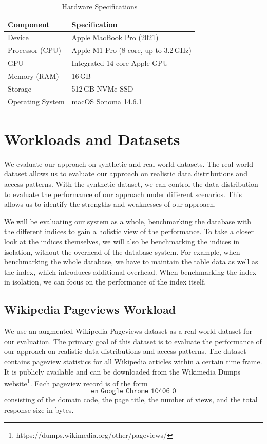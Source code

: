 \begin{table}[htbp]
\centering
\caption{Hardware Specifications}
\label{tab:hardware-specs}
\begin{tabular}{ll}
\toprule
\textbf{Component} & \textbf{Specification} \\ 
\midrule
Device & Apple MacBook Pro (2021) \\
Processor (CPU) & Apple M1 Pro (8-core, up to 3.2\,GHz) \\
GPU & Integrated 14-core Apple GPU \\
Memory (RAM) & 16\,GB \\
Storage & 512\,GB NVMe SSD \\
Operating System & macOS Sonoma 14.6.1 \\
\bottomrule
\end{tabular}
\end{table}

\section{Workloads and Datasets}
\label{sec:workloads-datasets}
We evaluate our approach on synthetic and real-world datasets.
The real-world dataset allows us to evaluate our approach on realistic data distributions and access patterns.
With the synthetic dataset, we can control the data distribution to evaluate the performance of our approach under different scenarios.
This allows us to identify the strengths and weaknesses of our approach.

We will be evaluating our system as a whole, benchmarking the database with the different indices to gain a holistic view of the performance.
To take a closer look at the indices themselves, we will also be benchmarking the indices in isolation, without the overhead of the database system.
For example, when benchmarking the whole database, we have to maintain the table data as well as the index, which introduces additional overhead.
When benchmarking the index in isolation, we can focus on the performance of the index itself.

\subsection*{Wikipedia Pageviews Workload}
We use an augmented Wikipedia Pageviews dataset \cite{wiki_pageviews} as a real-world dataset for our evaluation.
The primary goal of this dataset is to evaluate the performance of our approach on realistic data distributions and access patterns.
The dataset contains pageview statistics for all Wikipedia articles within a certain time frame.
It is publicly available and can be downloaded from the Wikimedia Dumps website\footnote{https://dumps.wikimedia.org/other/pageviews/}.
Each pageview record is of the form 
$$
\texttt{en Google\_Chrome 10406 0}
$$
consisting of the domain code, the page title, the number of views, and  the total response size in bytes.

